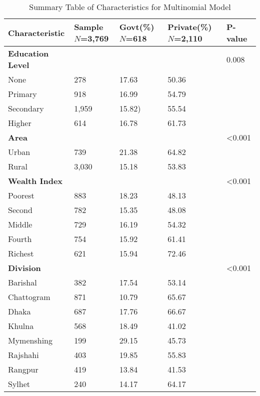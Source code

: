 \documentclass[
  letterpaper,
  DIV=11,
  numbers=noendperiod]{scrartcl}
\begin{document}
\newpage

\begin{table}
\centering
\caption{Summary Table of Characteristics for Multinomial Model}
\label{tab:summary_multinom}
\begin{tabular}{@{}p{}p{}p{}p{}p{}@{}}
\toprule
\textbf{Characteristic} & \textbf{Sample \ } $N$=3,769 & \textbf{Govt(\%)} $N$=618 & \textbf{Private(\%)} $N$=2,110 & \textbf{P-value} \\
\midrule
\textbf{Education Level} & & & & 0.008 \\
\quad None & 278 & 17.63 & 50.36 & \\
\quad Primary & 918 & 16.99 & 54.79 & \\
\quad Secondary & 1,959 & 15.82) & 55.54 & \\
\quad Higher & 614 & 16.78 & 61.73 & \\
\textbf{Area} & & & & <0.001 \\
\quad Urban & 739 & 21.38 & 64.82 & \\
\quad Rural & 3,030 & 15.18 & 53.83 & \\
\textbf{Wealth Index} & & & & <0.001 \\
\quad Poorest & 883 & 18.23 & 48.13 & \\
\quad Second & 782 & 15.35 & 48.08 & \\
\quad Middle & 729 & 16.19 & 54.32 & \\
\quad Fourth & 754 & 15.92 & 61.41 & \\
\quad Richest & 621 & 15.94 & 72.46 & \\
\textbf{Division} & & & & <0.001 \\
\quad Barishal & 382 & 17.54 & 53.14 & \\
\quad Chattogram & 871 & 10.79 & 65.67 & \\
\quad Dhaka & 687 & 17.76 & 66.67 & \\
\quad Khulna & 568 & 18.49 & 41.02 & \\
\quad Mymenshing & 199 & 29.15 & 45.73 & \\
\quad Rajshahi & 403 & 19.85 & 55.83 & \\
\quad Rangpur & 419 & 13.84 & 41.53 & \\
\quad Sylhet & 240 & 14.17 & 64.17 & \\
\bottomrule
\end{tabular}
\end{table}

\newpage
\end{document}
